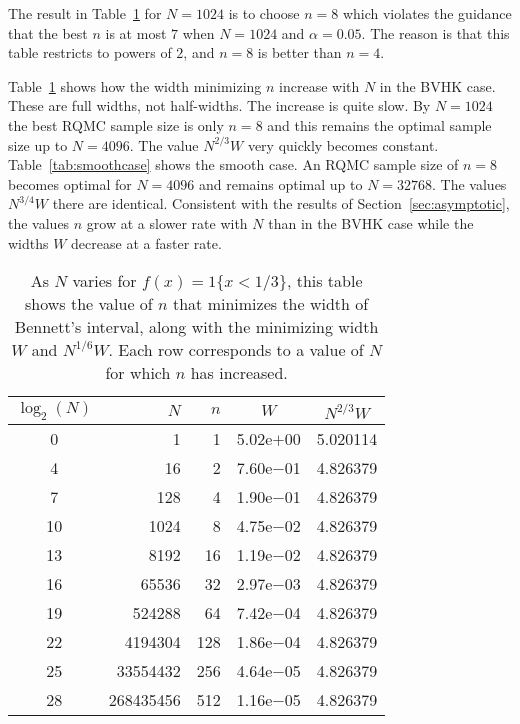 \documentclass{article}
\newcommand{\art}[1]{\begingroup\color{blue}#1\endgroup}
\newcommand{\phz}{\phantom{0}}
\begin{document}
\art{The result in Table~\ref{tab:bvhkcase} for $N=1024$
is to choose $n=8$ which violates the guidance that
the best $n$ is at most $7$ when $N=1024$ and $\alpha=0.05$. 
The reason is that this
table restricts to powers of $2$, and $n=8$ is better
than $n=4$.
}

Table~\ref{tab:bvhkcase} shows how the width
minimizing $n$ increase with $N$ in the BVHK
case. These are full widths, not half-widths.
The increase is quite slow. By $N=1024$
the best RQMC sample size is only $n=8$
and this remains the optimal sample size up to $N=4096$.
The value $N^{2/3}W$ very quickly becomes
constant.
Table~\ref{tab:smoothcase} shows the smooth
case.  An RQMC sample size of $n=8$ becomes
optimal for $N=4096$ and remains optimal up
to $N=32768$.  The values $N^{3/4}W$
there are identical. Consistent with the results of
Section~\ref{sec:asymptotic}, the values $n$
grow at a slower rate with $N$ than in the
BVHK case while the widths $W$ decrease at
a faster rate.



\begin{table}[t]\centering
\begin{tabular}{crrcc}
\toprule
   $\log_2(N)$&        $N$ &  $n$ & $W$ & $N^{2/3}W$\\
   \midrule
   \phz0&         1&   1& 5.02e$+$00 &5.020114\\
   \phz4&        16&   2& 7.60e$-$01 &4.826379\\
   \phz7&       128&   4& 1.90e$-$01 &4.826379\\
  10&      1024&   8& 4.75e$-$02 &4.826379\\
  13&      8192&  16& 1.19e$-$02 &4.826379\\
  16&     65536&  32& 2.97e$-$03 &4.826379\\
  19&    524288&  64& 7.42e$-$04 &4.826379\\
  22&   4194304& 128& 1.86e$-$04 &4.826379\\
  25&  33554432& 256& 4.64e$-$05 &4.826379\\
  28& 268435456& 512& 1.16e$-$05 &4.826379\\
 \bottomrule
\end{tabular}
\caption{\label{tab:bvhkcase}
As $N$ varies for $f(x)=1\{x<1/3\}$, this table shows the
value of $n$ that minimizes the width of Bennett's
interval, along with the minimizing width $W$
and $N^{1/6}W$. Each row corresponds to a value of $N$
for which $n$ has increased.}
\end{table}
\end{document}
